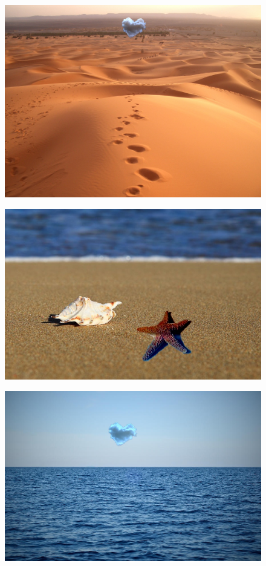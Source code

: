 \documentclass[oneside]{article}
\begin{document}
\begin{figure}[htbp]
\centering
\includegraphics[width=1\textwidth]{./img/normal_dest_desert_nube.jpg}
\caption{}
\label{fig:7}
\end{figure}

\begin{figure}[htbp]
\centering
\includegraphics[width=1\textwidth]{./img/mix_dest_sand_estrella.jpg}
\caption{}
\label{fig:8}
\end{figure}

\begin{figure}[htbp]
\centering
\includegraphics[width=1\textwidth]{./img/mix_dest_sea_nube.jpg}
\caption{}
\label{fig:9}
\end{figure}
\end{document}
